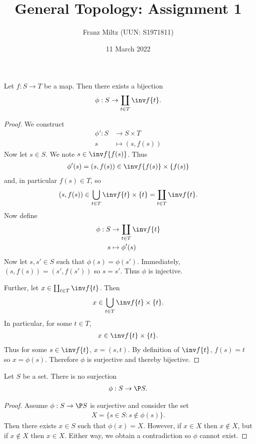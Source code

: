\documentclass{article}
\begin{document}
\title{General Topology: Assignment 1}
\author{Franz Miltz (UUN: S1971811)}
\date{11 March 2022}
\maketitle

\begin{claim*}[1]
  Let $f:S\to T$ be a map. Then there exists a bijection
  \begin{align*}
    \phi : S \to \coprod_{t\in T} \inv f \{t\}.
  \end{align*}
  \begin{proof}
    We construct
    \begin{align*}
      \phi' : S & \to S \times T \\
      s & \mapsto (s, f(s))
    \end{align*}
    Now let $s\in S$. We note $s\in \inv f\{f(s)\}$. Thus
    \begin{align*}
      \phi'(s)=(s,f(s))\in \inv f\{f(s)\}\times \{f(s)\}
    \end{align*}
    and, in particular $f(s)\in T$, so
    \begin{align*}
      (s,f(s))\in \bigcup_{t\in T} \inv f \{t\}\times \{t\} = \coprod_{t\in T} \inv f \{t\}.
    \end{align*}
    Now define
    \begin{align*}
      \phi : S & \to \coprod_{t\in T} \inv f \{t\} \\
      s & \mapsto \phi'(s)
    \end{align*}
    Now let $s,s'\in S$ such that $\phi(s)=\phi(s')$. Immediately,
    $(s,f(s))=(s',f(s'))$ so $s=s'$. Thus $\phi$ is injective.

    Further, let $x\in \coprod_{t\in T} \inv f\{t\}$. Then
    \begin{align*}
      x \in \bigcup_{t\in T} \inv f \{t\} \times \{t\}.
    \end{align*}
    In particular, for some $t\in T$,
    \begin{align*}
      x\in \inv f\{t\} \times \{t\}.
    \end{align*}
    Thus for some $s\in \inv f\{t\}$, $x=(s,t)$. By definition of $\inv f\{t\}$,
    $f(s)=t$ so $x=\phi(s)$. Therefore $\phi$ is surjective and thereby bijective.
  \end{proof}
\end{claim*}

\begin{claim*}[2]
  Let $S$ be a set. There is no surjection
  \begin{align*}
    \phi : S \to \P S.
  \end{align*}
  \begin{proof}
    Assume $\phi:S\to \P S$ is surjective and consider the set
    \begin{align*}
      X = \{ s\in S : s \not\in \phi(s)\}.
    \end{align*}
    Then there exists $x\in S$ such that $\phi(x) = X$. However, if $x\in X$ then
    $x\not\in X$, but if $x\not\in X$ then $x\in X$. Either way, we obtain a contradiction
    so $\phi$ cannot exist.
  \end{proof}
\end{claim*}
\end{document}
